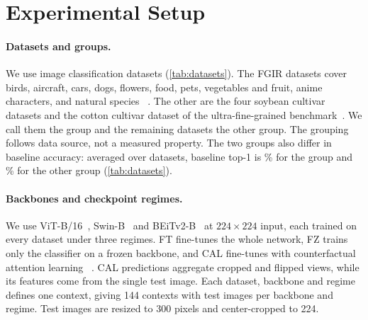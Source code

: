 \section{Experimental Setup}
\label{sec:setup}

\paragraph{Datasets and groups.}
We use  image classification datasets (\cref{tab:datasets}).
The  FGIR datasets cover birds, aircraft, cars, dogs, flowers, food, pets, vegetables and fruit, anime characters, and natural species~\cite{wah2011cub,vanhorn2015nabirds,maji2013fine,krause2013cars,khosla2011dogs,nilsback2008flowers,bossard2014food,parkhi2012pets,hou2017vegfru,vanhorn2018inat} .
The other  are the four soybean cultivar datasets and the cotton cultivar dataset of the ultra-fine-grained benchmark~\cite{yu2021benchmark}.
We call them the \SC{} group and the remaining  datasets the other group.
The grouping follows data source, not a measured property.
The two groups also differ in baseline accuracy: averaged over datasets, baseline top-1 is \% for the \SC{} group and \% for the other group (\cref{tab:datasets}).



\paragraph{Backbones and checkpoint regimes.}
We use ViT-B/16~\cite{dosovitskiy2021vit}, Swin-B~\cite{liu2021swin} and BEiTv2-B~\cite{peng2022beitv2} at $224\times224$ input, each trained on every dataset under three regimes.
FT fine-tunes the whole network, FZ trains only the classifier on a frozen backbone, and CAL fine-tunes with counterfactual attention learning~\cite{rao2021cal} .
CAL predictions aggregate cropped and flipped views, while its features come from the single test image.
Each dataset, backbone and regime defines one context, giving 144 contexts with  test images per backbone and regime.
Test images are resized to 300 pixels and center-cropped to 224.

